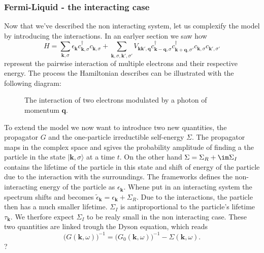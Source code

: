 \documentclass[../main.tex]{subfile}
\begin{document}
\subsubsection{Fermi-Liquid - the interacting case}
Now that we've described the non interacting system, let us complexify the model by introducing the interactions.
In an earlyer section we saw how
\begin{equation} \label{eq:FermiLiquid_Hamiltonian}
    H = \sum_{\bm{k},\sigma} \epsilon_{\bm{k}} c_{\bm{k},\sigma}^{\dagger}c_{\bm{k},\sigma} + \sum_{\bm{k},\sigma,\bm{k}',\sigma'}
        V_{\bm{k}\bm{k}', \bm{q}} c_{\bm{k}-\bm{q},\sigma}^{\dagger}c_{\bm{k}+\bm{q},\sigma'}^{\dagger}c_{\bm{k},\sigma}c_{\bm{k}',\sigma'}
\end{equation}
represent the pairwise interaction of multiple electrons and their respective energy. 
The process the Hamiltonian describes can be illustrated with the following diagram:
\begin{figure}[H]
    \centering
    \label{ref:photon_exchange}
    \caption{The interaction of two electrons modulated by a photon of momentum $\bm{q}$.}
\end{figure}
To extend the model we now want to introduce two new quantities,
the propagator $G$ and the one-particle irreductible self-energy $\Sigma$.
The propagator maps in the complex space and sgives the probability amplitude of finding a the particle in the state $|\bm{k},\sigma\rangle$ at a time $t$. On the other hand 
$\Sigma = \Sigma_R + \im \Sigma_I$ contains 
the lifetime of the particle in this state and shift of energy of the particle due to the interaction with the surroundings. The frameworks defines the 
non-interacting energy of the particle as $\epsilon_{\bm{k}}$. Whene put in an interacting system the spectrum shifts and becomes 
$\tilde{\epsilon}_{\bm{k}} =  \epsilon_{\bm{k}} + \Sigma_R$. Due to the interactions, the particle then has a much smaller lifetime. $\Sigma_I$ is antiproportional to 
the particle's lifetime $\tau_{\bm{k}}$. We therfore expect $\Sigma_I$ to be realy small in the non interacting case. 
These two quantities are linked trough the Dyson equation, which reads
\[
    \bigl(G(\bm{k}, \omega)\bigr)^{-1} =  \bigl(G_0(\bm{k}, \omega)\bigr)^{-1} - \Sigma(\bm{k},\omega).
\]
?\\
\end{document}

